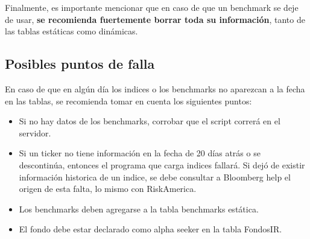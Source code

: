 \documentclass{article}
\begin{document}
Finalmente, es importante mencionar que en caso de que un benchmark se deje de usar, \textbf{se recomienda fuertemente borrar toda su información}, tanto de las tablas estáticas como dinámicas.

\subsection{Posibles puntos de falla}

En caso de que en algún día los indices o los benchmarks no aparezcan a la fecha en las tablas, se recomienda tomar en cuenta los siguientes puntos:
\begin{itemize}
\item Si no hay datos de los benchmarks, corrobar que el script correrá en el servidor.
\item Si un ticker no tiene información en la fecha de 20 días atrás o se descontinúa, entonces el programa que carga indices fallará. Si dejó de existir información historica de un indice, se debe consultar a Bloomberg help el origen de esta falta, lo mismo con RiskAmerica.
\item Los benchmarks deben agregarse a la tabla benchmarks estática.
\item El fondo debe estar declarado como alpha seeker en la tabla FondosIR.
\end{itemize}
\end{document}
